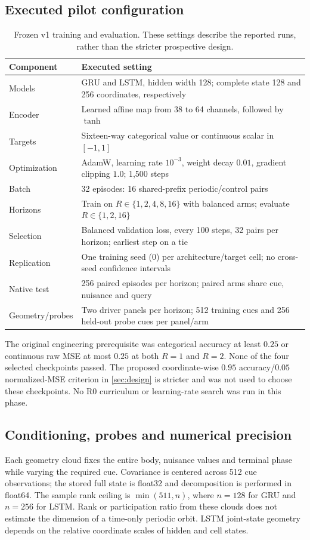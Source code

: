 \subsection{Executed pilot configuration}
\label{app:training}
\begin{table}[htbp]
\centering\small
\caption{Frozen v1 training and evaluation. These settings describe the reported runs, rather than the stricter prospective design.}
\begin{tabular}{lp{10.3cm}}
\toprule
Component & Executed setting\\
\midrule
Models & GRU and LSTM, hidden width 128; complete state 128 and 256 coordinates, respectively\\
Encoder & Learned affine map from 38 to 64 channels, followed by $\tanh$\\
Targets & Sixteen-way categorical value or continuous scalar in $[-1,1]$\\
Optimization & AdamW, learning rate $10^{-3}$, weight decay $0.01$, gradient clipping $1.0$; 1,500 steps\\
Batch & 32 episodes: 16 shared-prefix periodic/control pairs\\
Horizons & Train on $R\in\{1,2,4,8,16\}$ with balanced arms; evaluate $R\in\{1,2,16\}$\\
Selection & Balanced validation loss, every 100 steps, 32 pairs per horizon; earliest step on a tie\\
Replication & One training seed (0) per architecture/target cell; no cross-seed confidence intervals\\
Native test & 256 paired episodes per horizon; paired arms share cue, nuisance and query\\
Geometry/probes & Two driver panels per horizon; 512 training cues and 256 held-out probe cues per panel/arm\\
\bottomrule
\end{tabular}
\end{table}
The original engineering prerequisite was categorical accuracy at least $0.25$ or continuous raw MSE at most $0.25$ at both $R=1$ and $R=2$. None of the four selected checkpoints passed. The proposed coordinate-wise $0.95$ accuracy/$0.05$ normalized-MSE criterion in \cref{sec:design} is stricter and was not used to choose these checkpoints. No R0 curriculum or learning-rate search was run in this phase.

\subsection{Conditioning, probes and numerical precision}
Each geometry cloud fixes the entire body, nuisance values and terminal phase while varying the required cue. Covariance is centered across 512 cue observations; the stored full state is float32 and decomposition is performed in float64. The sample rank ceiling is $\min(511,n)$, where $n=128$ for GRU and $n=256$ for LSTM. Rank or participation ratio from these clouds does not estimate the dimension of a time-only periodic orbit. LSTM joint-state geometry depends on the relative coordinate scales of hidden and cell states.

